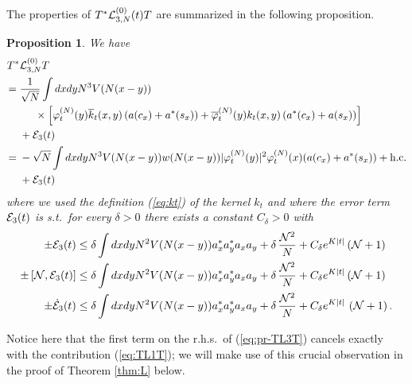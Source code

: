 \documentclass[11pt,a4paper]{article}
\newtheorem{proposition}[thm]{Proposition}
\newcommand{\ech}[2]{#2}	%
\newcommand{\ekt}{e^{K\lvert t\rvert}}	%
\newcommand{\cE}{{\cal E}}
\newcommand{\cL}{{\cal L}}
\newcommand{\cN}{{\cal N}}
\begin{document}
The properties of $T^* \cL_{3,N}^{(0)} (t) T$ are summarized in the following proposition. 
\begin{proposition}\label{prop:TL3T}
We have
\begin{equation}\label{eq:pr-TL3T} \begin{split} T^* &\cL^{(0)}_{3,N} T \\ =  \; & \frac{1}{\sqrt{N}} 
\int dx dy N^3 V (N (x-y))  \\ & \hspace{.5cm} \times \left[ \varphi_t^{(N)} (y) \overline{k}_t (x,y)  \left( a (c_x) + a^* (s_x) \right)   + \overline{\varphi}_t^{(N)} (y) k_t (x,y)  \left( a^* (c_x) + a (s_x) \right)  \right] \\ &+ \cE_3 (t) \\
= \; &- \sqrt{N} \int dx dy N^3 V(N (x-y)) w(N (x-y)) |\varphi_t^{(N)} (y)|^2 \varphi_t^{(N)} (x) (a (c_x) + a^* (s_x)) + \text{h.c.} \\ &+ \cE_3 (t)
\end{split} \end{equation}
where we used the definition (\ref{eq:kt}) of the kernel $k_t$ and where the error term $\cE_3 (t)$ is s.t.\ for every $\delta > 0$ there exists a constant $C_\delta > 0$ with
\begin{equation}\label{eq:TL3T-cl}
\begin{split} \pm \cE_3 (t)  &\leq \delta \int dx dy N^2 V (N (x-y)) a_x^* a_y^* a_x a_y + \delta \,\frac{\cN^2}{N} + C_\delta \ech{\| \varphi_t^{(N)} \|_{H^2}^2}{\ekt} \left(\cN + 1\right) \\
\pm \left[ \cN , \cE_3 (t) \right] &\leq \delta \int dx dy N^2 V (N (x-y)) a_x^* a_y^* a_x a_y + \delta \,  \frac{\cN^2}{N} + C_\delta  \ech{\| \varphi_t^{(N)} \|_{H^2}^2}{\ekt}  \left(\cN + 1\right) \\
\pm \dot{\cE}_3 (t) & \leq \delta \int dx dy N^2 V (N (x-y)) a_x^* a_y^* a_x a_y + \delta \, \frac{\cN^2}{N} 
\ech{\\ & \hspace{.5cm} + C_\delta \left( \| \varphi_t^{(N)} \|_{H^4}^2 \| \varphi_t^{(N)} \|_{H^2}^2 + \| \varphi_t^{(N)} \|_{H^2}^4 \right)}{+ C_\delta \ekt} \,  \left( \cN + 1\right).
\end{split} \end{equation}
\end{proposition}

Notice here that the first term on the r.h.s.\ of (\ref{eq:pr-TL3T}) cancels exactly with the contribution (\ref{eq:TL1T}); we will make use of this crucial observation in the proof of Theorem \ref{thm:L} below.
\end{document}
